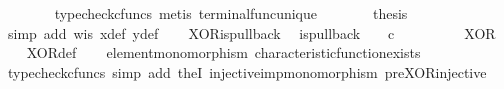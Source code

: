 \begin{isabellebody}
\ \ \ \ \ \ \isamarkupfalse%
\ {\isacharparenleft}{\kern0pt}typecheck{\isacharunderscore}{\kern0pt}cfuncs{\isacharcomma}{\kern0pt}\ metis\ terminal{\isacharunderscore}{\kern0pt}func{\isacharunderscore}{\kern0pt}unique{\isacharparenright}{\kern0pt}\isanewline
\ \ \ \ \isamarkupfalse%
\ \isamarkupfalse%
\ {\isacharquery}{\kern0pt}thesis\isanewline
\ \ \ \ \ \ \isamarkupfalse%
\ {\isacharparenleft}{\kern0pt}simp\ add{\isacharcolon}{\kern0pt}\ w{\isacharunderscore}{\kern0pt}is\ x{\isacharunderscore}{\kern0pt}def\ y{\isacharunderscore}{\kern0pt}def{\isacharparenright}{\kern0pt}\isanewline
\ \ \isamarkupfalse%
\isanewline
{}\isamarkupfalse%
%
\endisatagproof
{\isafoldproof}%
%
\isadelimproof
\isanewline
%
\endisadelimproof
\isanewline
{}\isamarkupfalse%
\ XOR{\isacharunderscore}{\kern0pt}is{\isacharunderscore}{\kern0pt}pullback{\isacharcolon}{\kern0pt}\isanewline
\ \ {\isachardoublequoteopen}is{\isacharunderscore}{\kern0pt}pullback\ {\isacharparenleft}{\kern0pt}{\isasymone}{\isasymCoprod}{\isasymone}{\isacharparenright}{\kern0pt}\ {\isasymone}\ {\isacharparenleft}{\kern0pt}{\isasymOmega}\ {\isasymtimes}\isactrlsub c\ {\isasymOmega}{\isacharparenright}{\kern0pt}\ {\isasymOmega}\ {\isacharparenleft}{\kern0pt}{\isasymbeta}\isactrlbsub {\isacharparenleft}{\kern0pt}{\isasymone}{\isasymCoprod}{\isasymone}{\isacharparenright}{\kern0pt}\isactrlesub {\isacharparenright}{\kern0pt}\ {\isasymt}\ {\isacharparenleft}{\kern0pt}{\isasymlangle}{\isasymt}{\isacharcomma}{\kern0pt}\ {\isasymf}{\isasymrangle}\ {\isasymamalg}\ {\isasymlangle}{\isasymf}{\isacharcomma}{\kern0pt}\ {\isasymt}{\isasymrangle}{\isacharparenright}{\kern0pt}\ XOR{\isachardoublequoteclose}\isanewline
%
\isadelimproof
\ \ %
\endisadelimproof
%
\isatagproof
{}\isamarkupfalse%
\ XOR{\isacharunderscore}{\kern0pt}def\isanewline
\ \ \isamarkupfalse%
\ element{\isacharunderscore}{\kern0pt}monomorphism\ characteristic{\isacharunderscore}{\kern0pt}function{\isacharunderscore}{\kern0pt}exists\isanewline
\ \ \isamarkupfalse%
\ {\isacharparenleft}{\kern0pt}typecheck{\isacharunderscore}{\kern0pt}cfuncs{\isacharcomma}{\kern0pt}\ simp\ add{\isacharcolon}{\kern0pt}\ the{}I{}\ injective{\isacharunderscore}{\kern0pt}imp{\isacharunderscore}{\kern0pt}monomorphism\ pre{\isacharunderscore}{\kern0pt}XOR{\isacharunderscore}{\kern0pt}injective{\isacharparenright}{\kern0pt}%
\endisatagproof
{\isafoldproof}%
%
\isadelimproof
\isanewline
%
\endisadelimproof

\end{isabellebody}
